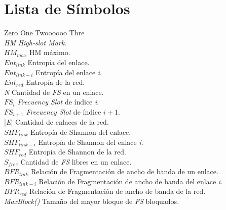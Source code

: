 \newpage
\chapter*{Lista de Símbolos\hfill}
\begin{tabbing}

\color{white}Zero \=\color{white}One \=\color{white}Twoooooo \=\color{white}Thre\\

\textit{HM} \>\>\>\textit{High-slot Mark}.\\
\textit{\(HM_{max}\)} \>\>\> HM máximo.\\

\textit{\(Ent_{link}\)} \>\>\> Entropía del enlace.\\
\textit{\(Ent_{link-i}\)} \>\>\> Entropía del enlace \textit{i}. \\
\textit{\(Ent_{red}\)} \>\>\> Entropía de la red. \\
\textit{N} \>\>\> Cantidad de \textit{FS} en un enlace.\\
\textit{\(FS_{i}\)} \>\>\> \textit{Frecuency Slot} de índice \textit{i}.\\
\textit{\(FS_{i+1}\)} \>\>\> \textit{Frecuency Slot} de índice \(\textit{i} + 1\).\\
|\textit{E}| \>\>\> Cantidad de enlaces de la red.\\

\textit{\(SHF_{link}\)} \>\>\> Entropía de Shannon del enlace.\\
\textit{\(SHF_{link-i}\)} \>\>\> Entropía de Shannon del enlace \textit{i}. \\
\textit{\(SHF_{red}\)} \>\>\> Entropía de Shannon de la red. \\
\textit{\(S_{free}\)} \>\>\> Cantidad de \textit{FS} libres en un enlace.\\

\textit{\(BFR_{link}\)} \>\>\> Relación de Fragmentación de ancho de banda de un enlace.\\
\textit{\(BFR_{link-i}\)} \>\>\> Relación de Fragmentación de ancho de banda del enlace \textit{i}. \\
\textit{\(BFR_{red}\)} \>\>\> Relación de Fragmentación de ancho de banda de la red. \\
\textit{MaxBlock()} \>\>\> Tamaño del mayor bloque de \textit{FS} bloquados.\\


\end{tabbing}
